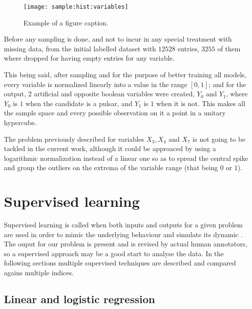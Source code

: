 \documentclass[journal]{IEEEtran}
\begin{document}
\begin{figure*}[ht]
    \texttt{[image: sample:hist:variables]}
    \caption{Example of a figure caption. \label{fig:sample:hist:variables}}
\end{figure*}

Before any sampling is done, and not to incur in any special treatment with
missing data, from the initial labelled dataset with $12528$ entries, $3255$ of
them where dropped for having empty entries for any variable. 

This being said, after sampling and for the purpose of better training all
models, every variable is normalized linearly into a value in the range $[0,1]$;
and for the output, 2 artificial and opposite boolean variables were created,
$Y_0$ and $Y_1$, where $Y_0$ is $1$ when the candidate is a pulsar, and $Y_1$ is
$1$ when it is not. This makes all the sample space and every possible
observation on it a point in a unitary hypercube.

The problem previously described for variables $X_3, X_4$ and $X_7$ is not going
to be tackled in the current work, although it could be approaced by using a
logarithmic normalization instead of a linear one so as to spread the central
spike and group the outliers on the extrema of the variable range (that being
$0$ or $1$).

\section{Supervised learning\label{sec:supervised}} 

Supervised learning is called when both inputs and outputs for a given problem
are used in order to mimic the underlying behaviour and simulate its dynamic
\cite{supervised:definition:rusell}. The ouput for our problem is present and is
revised by actual human annotators, so a supervised approach may be a good start
to analyse the data. In the following sections multiple supervised techniques
are described and compared agains multiple indices.

\subsection{Linear and logistic regression\label{sec:regression}}
\end{document}
